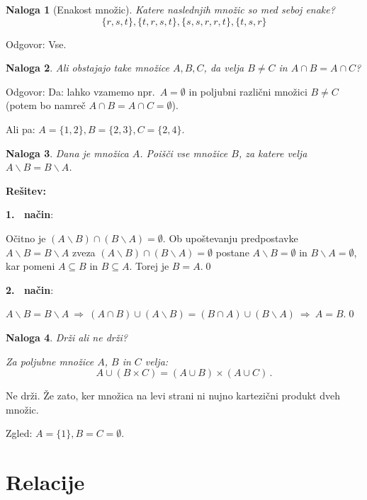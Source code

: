 \documentclass[11pt,paper=b5,footinclude,headinclude]{scrbook} %
\def\sledi {{~\Rightarrow~}}
\newtheorem*{problem}{Naloga}
\begin{document}
\begin{problem}[Enakost množic]
Katere naslednjih množic so med seboj enake?
$$\{r,s,t\}, \{t,r,s,t\}, \{s,s,r,r,t\}, \{t,s,r\}$$
\end{problem}

Odgovor: Vse.

\bigskip
\begin{problem}
Ali obstajajo take množice $A, B, C$, da velja $B\neq C$ in $A\cap B = A\cap C$?
\end{problem}

Odgovor: Da: lahko vzamemo npr.~$A = \emptyset$ in poljubni različni množici $B\neq C$
(potem bo namreč $A\cap B = A\cap C = \emptyset$).

Ali pa: $A = \{1,2\}, B = \{2,3\}, C = \{2,4\}$.


\begin{problem}
Dana je množica $A$. Poišči vse množice $B$, za katere velja
$A\backslash B = B\backslash A$.
\end{problem}

\textbf{Rešitev:}

\textbf{1.~ način}:

Očitno je
$(A\backslash B) \cap (B\backslash A)=\emptyset$.
Ob upoštevanju predpostavke $A\backslash B = B\backslash A$
zveza
$(A\backslash B) \cap (B\backslash A)=\emptyset$
postane
$A\backslash B =\emptyset$
in $B\backslash A =\emptyset$, kar pomeni
$A\subseteq B$ in $B\subseteq A$. Torej je $B = A$.\qed

\textbf{2.~ način}:

$A\backslash B = B\backslash A \sledi(A\cap B)\cup (A\backslash B) = (B\cap A)\cup (B\backslash A) \sledi A = B$.\qed

\begin{problem}
Drži ali ne drži?

Za poljubne množice $A$, $B$ in $C$ velja:
$$A\cup (B\times C) = (A\cup B)\times (A\cup C)\,.$$
\end{problem}

Ne drži. Že zato, ker množica na levi strani ni nujno kartezični produkt dveh množic.

Zgled: $A = \{1\}, B = C = \emptyset$.




\chapter{Relacije}

\end{document}

